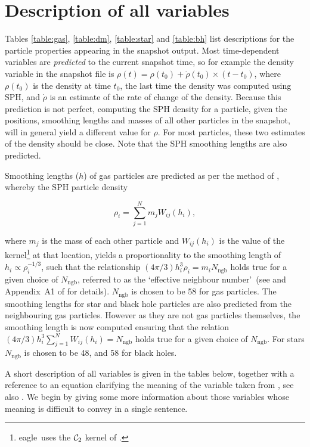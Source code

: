 \documentclass[10pt, a4paper]{article}
\newcommand{\eagle}{{\sc eagle}}
\begin{document}
\section{Description of all variables}
Tables \ref{table:gas}, \ref{table:dm}, \ref{table:star} and \ref{table:bh}
list descriptions for the particle properties appearing in the snapshot output.
Most time-dependent variables are {\em predicted} to the current snapshot time,
so for example the density variable in the snapshot file is $\rho(t) =
\rho(t_0)+\dot\rho(t_0)\times (t-t_0)$, where $\rho(t_0)$ is the density at
time $t_0$, the last time the density was computed using SPH, and $\dot\rho$ is
an estimate of the rate of change of the density. Because this prediction is
not perfect, computing the SPH density for a particle, given the positions,
smoothing lengths and masses of all other particles in the snapshot, will in
general yield a different value for $\rho$. For most particles, these two
estimates of the density should be close. Note that the SPH smoothing lengths
are also predicted.

Smoothing lengths ($h$) of gas particles are predicted as per the method of
\cite{hopkins2013}, whereby the SPH particle density

\begin{equation}
\label{eq:rho}
\rho_i = \sum_{j=1}^N m_j W_{ij}(h_i),
\end{equation}
	
\noindent where $m_j$ is the mass of each other particle and $W_{ij}(h_i)$ is
the value of the kernel\footnote{\eagle\ uses the ${\cal C}_2$ kernel of
\cite{Wendland1995}.} at that location, yields a proportionality to the
smoothing length of $h_i \propto \rho_i^{-1/3}$, such that the relationship $(4
\pi / 3) h_i^{3} \rho_i = m_i N_{\mathrm{ngb}}$ holds true for a given choice
of $N_{\mathrm{ngb}}$, referred to as the \lq effective neighbour number\rq\
(see \cite{hopkins2013} and Appendix~A1 of \cite{schaye2015} for details).
$N_{\mathrm{ngb}}$ is chosen to be 58 for gas particles. The smoothing lengths
for star and black hole particles are also predicted from the neighbouring gas
particles. However as they are not gas particles themselves, the smoothing
length is now computed ensuring that the relation $(4 \pi / 3) h_i^{3}
\sum_{j=1}^N W_{ij}(h_i) = N_{\mathrm{ngb}}$ holds true for a given choice of
$N_{\mathrm{ngb}}$. For stars $N_{\mathrm{ngb}}$ is chosen to be 48, and 58 for
black holes. 

A short description of all variables is given in the tables below, together
with a reference to an equation clarifying the meaning of the variable taken
from \cite{schaye2015}, see also \cite{mcalpine2016}. We begin by giving some
more information about those variables whose meaning is difficult to convey in
a single sentence.
\end{document}
